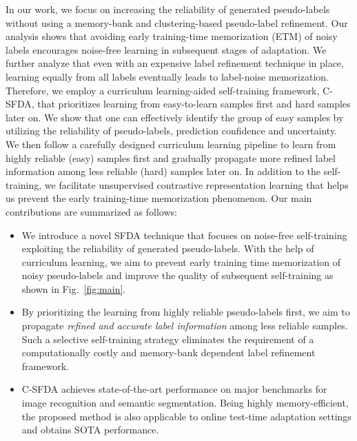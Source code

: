 \documentclass[10pt,twocolumn,letterpaper]{article}
\begin{document}
In our work, we focus on increasing the reliability of generated pseudo-labels without using a memory-bank and clustering-based pseudo-label refinement. Our analysis shows that avoiding early training-time memorization (ETM) of noisy labels encourages noise-free learning in subsequent stages of adaptation. We further analyze that even with an expensive label refinement technique in place, learning equally from all labels eventually leads to label-noise memorization. Therefore, we employ a curriculum learning-aided self-training framework, C-SFDA, that prioritizes learning from easy-to-learn samples first and hard samples later on. We show that one can effectively identify the group of easy samples by utilizing the reliability of pseudo-labels, \ie prediction confidence and uncertainty. We then follow a carefully designed curriculum learning pipeline to learn from highly reliable (easy) samples first and gradually propagate more refined label information among less reliable (hard) samples later on. In addition to the self-training, we facilitate unsupervised contrastive representation learning that helps us prevent the early training-time memorization phenomenon. 
Our main contributions are summarized as follows:    
\begin{itemize}
\vspace{-1mm}
\setlength\itemsep{0.2mm}
    \item We introduce a novel SFDA technique that focuses on noise-free self-training exploiting the reliability of generated pseudo-labels. With the help of curriculum learning, we aim to prevent early training time memorization of noisy pseudo-labels and improve the quality of subsequent self-training as shown in Fig.~\ref{fig:main}.
    \item By prioritizing the learning from highly reliable pseudo-labels first, we aim to propagate \emph{refined and accurate label information} among less reliable samples. Such a selective self-training strategy eliminates the requirement of a computationally costly and memory-bank dependent label refinement framework. 
\item C-SFDA achieves state-of-the-art performance on major benchmarks for image recognition and semantic segmentation. Being highly memory-efficient, the proposed method is also applicable to online test-time adaptation settings and obtains SOTA performance.  
\end{itemize}
\end{document}
